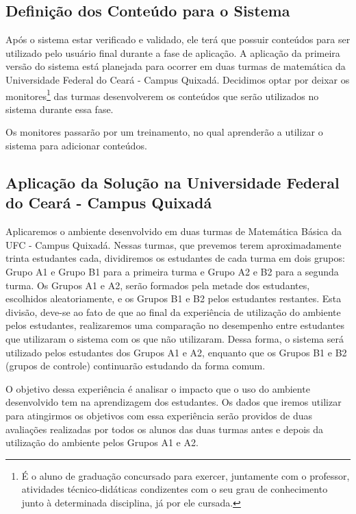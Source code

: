 \subsection{Definição dos Conteúdo para o Sistema}

Após o sistema estar verificado e validado, ele terá que possuir conteúdos para ser utilizado pelo usuário final durante a fase de aplicação. A aplicação da primeira versão do sistema está planejada 
para ocorrer em duas turmas de matemática da Universidade Federal do Ceará - Campus Quixadá. Decidimos optar por deixar os monitores\footnote{É o aluno de graduação concursado para exercer, 
juntamente 
com o professor, atividades técnico-didáticas condizentes com o seu grau de conhecimento junto à determinada disciplina, já por ele cursada.} das turmas desenvolverem os conteúdos que ser\~ao 
utilizados no sistema durante essa fase. 

Os monitores passar\~ao por um treinamento, no qual aprender\~ao a utilizar o sistema para adicionar conteúdos.

\subsection{Aplicação da Solução na Universidade Federal do Ceará - Campus Quixadá}

Aplicaremos o ambiente desenvolvido em duas turmas de Matemática Básica da UFC - Campus Quixadá. Nessas turmas, que prevemos terem aproximadamente trinta estudantes cada, dividiremos os estudantes de 
cada turma em dois grupos: Grupo A1 e Grupo B1 para a primeira turma e Grupo A2 e B2 para a segunda turma. Os Grupos A1 e A2, ser\~ao formados pela metade 
dos estudantes, escolhidos aleatoriamente, e os Grupos B1 e B2 pelos estudantes restantes. 
Esta divisão, deve-se ao fato de que ao final da experiência de utilização do ambiente pelos estudantes, realizaremos uma comparação no desempenho entre estudantes que utilizaram o sistema com os que 
não utilizaram. Dessa forma, o sistema será utilizado pelos estudantes dos Grupos A1 e A2, enquanto que os Grupos B1 e B2 (grupos de controle) continuar\~ao estudando da forma comum. 

O objetivo dessa experiência \'e analisar o impacto que o uso do ambiente desenvolvido tem na aprendizagem dos estudantes. Os dados que iremos utilizar para atingirmos os objetivos com essa 
experiência ser\~ao providos de duas avalia\c{c}\~oes realizadas por todos os alunos das duas turmas antes e depois da utiliza\c{c}\~ao do ambiente pelos Grupos A1 e A2.

